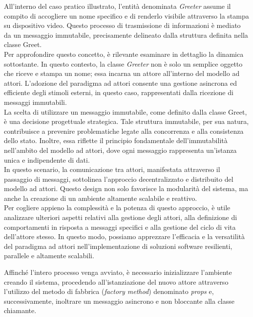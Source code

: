All'interno del caso pratico illustrato, l'entità denominata \textit{Greeter} assume il compito di accogliere un nome specifico e di renderlo visibile attraverso la stampa su dispositivo video.
Questo processo di trasmissione di informazioni è mediato da un messaggio immutabile, precisamente delineato dalla struttura definita nella classe Greet. \\
Per approfondire questo concetto, è rilevante esaminare in dettaglio la dinamica sottostante.
In questo contesto, la classe \textit{Greeter} non è solo un semplice oggetto che riceve e stampa un nome; essa incarna un attore all'interno del modello ad attori.
L'adozione del paradigma ad attori consente una gestione asincrona ed efficiente degli stimoli esterni, in questo caso, rappresentati dalla ricezione di messaggi immutabili. \\
La scelta di utilizzare un messaggio immutabile, come definito dalla classe Greet, è una decisione progettuale strategica.
Tale struttura immutabile, per sua natura, contribuisce a prevenire problematiche legate alla concorrenza e alla consistenza dello stato.
Inoltre, essa riflette il principio fondamentale dell'immutabilità nell'ambito del modello ad attori, dove ogni messaggio rappresenta un'istanza unica e indipendente di dati. \\
In questo scenario, la comunicazione tra attori, manifestata attraverso il passaggio di messaggi, sottolinea l'approccio decentralizzato e distribuito del modello ad attori.
Questo design non solo favorisce la modularità del sistema, ma anche la creazione di un ambiente altamente scalabile e reattivo. \\
Per cogliere appieno la complessità e la potenza di questo approccio, è utile analizzare ulteriori aspetti relativi alla gestione degli attori, alla definizione di comportamenti in risposta a messaggi specifici e alla gestione del ciclo di vita dell'attore stesso.
In questo modo, possiamo apprezzare l'efficacia e la versatilità del paradigma ad attori nell'implementazione di soluzioni software resilienti, parallele e altamente scalabili. 

 

Affinché l'intero processo venga avviato, è necessario inizializzare l'ambiente creando il sistema, procedendo all'istanziazione del nuovo attore attraverso l'utilizzo del metodo di fabbrica (\textit{factory method}) denominato \textit{props} e, successivamente, inoltrare un messaggio asincrono e non bloccante alla classe chiamante. \\

